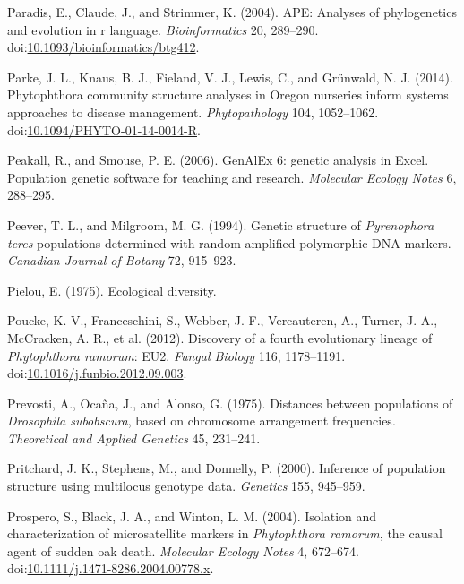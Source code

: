 \documentclass[double,12pt]{beavtex}
\begin{document}
  \hypertarget{ref-paradis2004ape}{}
  Paradis, E., Claude, J., and Strimmer, K. (2004). APE: Analyses of
  phylogenetics and evolution in r language. \emph{Bioinformatics} 20,
  289--290.
  doi:\href{https://doi.org/10.1093/bioinformatics/btg412}{10.1093/bioinformatics/btg412}.
  
  \hypertarget{ref-parke2014phytophthora}{}
  Parke, J. L., Knaus, B. J., Fieland, V. J., Lewis, C., and Grünwald, N.
  J. (2014). Phytophthora community structure analyses in Oregon nurseries
  inform systems approaches to disease management. \emph{Phytopathology}
  104, 1052--1062.
  doi:\href{https://doi.org/10.1094/PHYTO-01-14-0014-R}{10.1094/PHYTO-01-14-0014-R}.
  
  \hypertarget{ref-Peakall:2006}{}
  Peakall, R., and Smouse, P. E. (2006). GenAlEx 6: genetic analysis in
  Excel. Population genetic software for teaching and research.
  \emph{Molecular Ecology Notes} 6, 288--295.
  
  \hypertarget{ref-peever1994genetic}{}
  Peever, T. L., and Milgroom, M. G. (1994). Genetic structure of
  \emph{Pyrenophora teres} populations determined with random amplified
  polymorphic DNA markers. \emph{Canadian Journal of Botany} 72, 915--923.
  
  \hypertarget{ref-pielou1975ecological}{}
  Pielou, E. (1975). Ecological diversity.
  
  \hypertarget{ref-vanpoucke2012discovery}{}
  Poucke, K. V., Franceschini, S., Webber, J. F., Vercauteren, A., Turner,
  J. A., McCracken, A. R., et al. (2012). Discovery of a fourth
  evolutionary lineage of \emph{Phytophthora ramorum}: EU2. \emph{Fungal
  Biology} 116, 1178--1191.
  doi:\href{https://doi.org/10.1016/j.funbio.2012.09.003}{10.1016/j.funbio.2012.09.003}.
  
  \hypertarget{ref-prevosti1975distances}{}
  Prevosti, A., Ocaña, J., and Alonso, G. (1975). Distances between
  populations of \emph{Drosophila subobscura}, based on chromosome
  arrangement frequencies. \emph{Theoretical and Applied Genetics} 45,
  231--241.
  
  \hypertarget{ref-pritchard2000inference}{}
  Pritchard, J. K., Stephens, M., and Donnelly, P. (2000). Inference of
  population structure using multilocus genotype data. \emph{Genetics}
  155, 945--959.
  
  \hypertarget{ref-prospero2004isolation}{}
  Prospero, S., Black, J. A., and Winton, L. M. (2004). Isolation and
  characterization of microsatellite markers in \emph{Phytophthora
  ramorum}, the causal agent of sudden oak death. \emph{Molecular Ecology
  Notes} 4, 672--674.
  doi:\href{https://doi.org/10.1111/j.1471-8286.2004.00778.x}{10.1111/j.1471-8286.2004.00778.x}.
  
\end{document}
